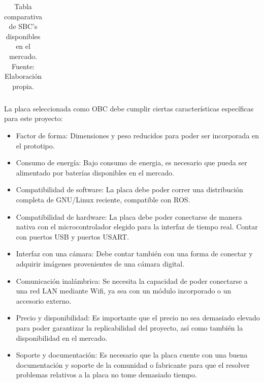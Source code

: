 \begin{table}[]
{\begin{tabular}{@{}|c|c|c|c|c|c|c|c|@{}}
        \end{tabular}%
        }
        \caption[Tabla comparativa de SBC's disponibles en el mercado.]{Tabla comparativa de SBC's disponibles en el mercado. Fuente: Elaboración propia.}
        \label{tbl:sbc}
        \end{table}


    La placa seleccionada como OBC debe cumplir ciertas características específicas para este proyecto:


    \begin{itemize}
        \item Factor de forma: Dimensiones y peso reducidos para poder ser incorporada en el prototipo.
        \item Consumo de energía: Bajo consumo de energia, es necesario que pueda ser alimentado por baterías disponibles en el mercado.
        \item Compatibilidad de software: La placa debe poder correr una distribución completa de GNU/Linux reciente, compatible con ROS.
        \item Compatibilidad de hardware: La placa debe poder conectarse de manera nativa con el microcontrolador elegido para la interfaz de tiempo real. Contar con puertos USB y puertos USART.
        \item Interfaz con una cámara: Debe contar también con una forma de conectar y adquirir imágenes provenientes de una cámara digital.
        \item Comunicación inalámbrica: Se necesita la capacidad de poder conectarse a una red LAN mediante Wifi, ya sea con un módulo incorporado o un accesorio externo.
        \item Precio y disponibilidad: Es importante que el precio no sea demasiado elevado para poder garantizar la replicabilidad del proyecto, así como también la disponibilidad en el mercado.
        \item Soporte y documentación: Es necesario que la placa cuente con una buena documentación y soporte de la comunidad o fabricante para que el resolver problemas relativos a la placa no tome demasiado tiempo.
    \end{itemize}

